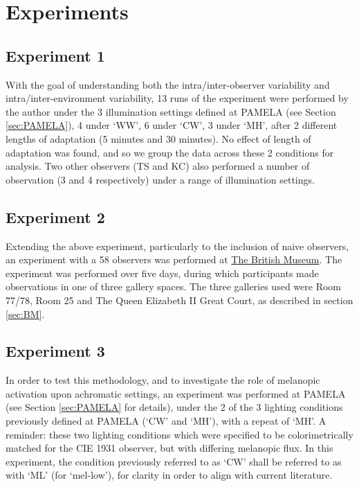 
\newpage

\section{Experiments}

\subsection{Experiment 1}
With the goal of understanding both the intra/inter-observer variability and intra/inter-environment variability, 13 runs of the experiment were performed by the author under the 3 illumination settings defined at \gls{PAMELA} (see Section \ref{sec:PAMELA}), 4 under `WW', 6 under `CW', 3 under `MH', after 2 different lengths of adaptation (5 minutes and 30 minutes). No effect of length of adaptation was found, and so we group the data across these 2 conditions for analysis. Two other observers (TS and KC) also performed a number of observation (3 and 4 respectively) under a range of illumination settings.

\subsection{Experiment 2}

Extending the above experiment, particularly to the inclusion of naive observers, an experiment with a 58 observers was performed at \hyperref[sec:BM]{The British Museum}. The experiment was performed over five days, during which participants made observations in one of three gallery spaces. The three galleries used were Room 77/78, Room 25 and The Queen Elizabeth II Great Court, as described in section \ref{sec:BM}. 

\subsection{Experiment 3}
In order to test this methodology, and to investigate the role of melanopic activation upon achromatic settings, an experiment was performed at \gls{PAMELA} (see Section \ref{sec:PAMELA} for details), under the 2 of the 3 lighting conditions previously defined at \gls{PAMELA} (`CW' and `MH'), with a repeat of `MH'. A reminder: these two lighting conditions which were specified to be colorimetrically matched for the CIE 1931 observer, but with differing melanopic flux. In this experiment, the condition previously referred to as `CW' shall be referred to as with `ML' (for `mel-low'), for clarity in order to align with current literature.

